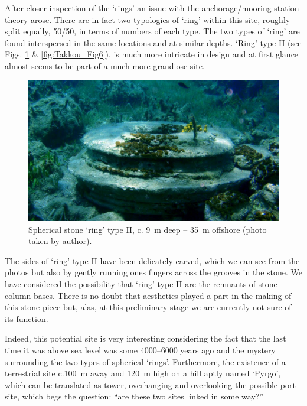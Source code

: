 After closer inspection of the ‘rings’ an issue with the anchorage/mooring station theory arose. There are in fact two typologies of ‘ring’ within this site, roughly split equally, 50/50, in terms of numbers of each type. The two types of ‘ring’ are found interspersed in the same locations and at similar depths. ‘Ring’ type II (see Figs. \ref{fig:Takkou_Fig5} \& \ref{fig:Takkou_Fig6}), is much more intricate in design and at first glance almost seems to be part of a much more grandiose site. 
	
\begin{figure}
	\includegraphics[width=\linewidth]{figures/takkou_dobroski_Fig5.jpg}
	\centering
	\caption{Spherical stone ‘ring’ type II, c. \SI{9}{\metre} deep -- \SI{35}{\metre} offshore (photo taken by author).}
	\label{fig:Takkou_Fig5}
\end{figure}

The sides of ‘ring’ type II have been delicately carved, which we can see from the photos but also by gently running ones fingers across the grooves in the stone. We have considered the possibility that ‘ring’ type II are the remnants of stone column bases. There is no doubt that aesthetics played a part in the making of this stone piece but, alas, at this preliminary stage we are currently not sure of its function. 

Indeed, this potential site is very interesting considering the fact that the last time it was above sea level was some 4000--6000 years ago \parencite{Flemming_2014} and the mystery surrounding the two types of spherical ‘rings’. Furthermore, the existence of a terrestrial site c.\SI{100}{\metre} away and \SI{120}{\metre} high on a hill aptly named ‘Pyrgo’, which can be translated as tower, overhanging and overlooking the possible port site, which begs the question: “are these two sites linked in some way?”
	
